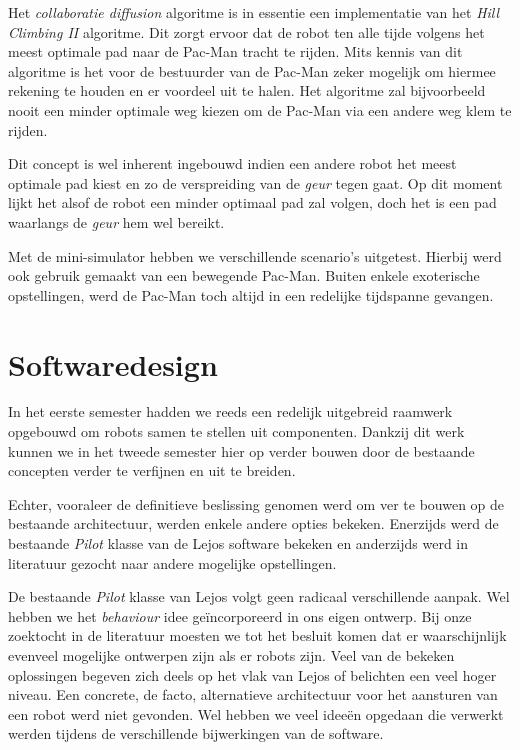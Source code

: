 \documentclass[12pt,a4paper]{report}
\begin{document}
Het \emph{collaboratie diffusion} algoritme is in essentie een implementatie van het \emph{Hill Climbing II} algoritme. Dit zorgt ervoor dat de robot ten alle tijde volgens het meest optimale pad naar de Pac-Man tracht te rijden. Mits kennis van dit algoritme is het voor de bestuurder van de Pac-Man zeker mogelijk om hiermee rekening te houden en er voordeel uit te halen. Het algoritme zal bijvoorbeeld nooit een minder optimale weg kiezen om de Pac-Man via een andere weg klem te rijden.

Dit concept is wel inherent ingebouwd indien een andere robot het meest optimale pad kiest en zo de verspreiding van de \emph{geur} tegen gaat. Op dit moment lijkt het alsof de robot een minder optimaal pad zal volgen, doch het is een pad waarlangs de \emph{geur} hem wel bereikt.

Met de mini-simulator hebben we verschillende scenario's uitgetest. Hierbij werd ook gebruik gemaakt van een bewegende Pac-Man. Buiten enkele exoterische opstellingen, werd de Pac-Man toch altijd in een redelijke tijdspanne gevangen.

\chapter{Softwaredesign}

In het eerste semester hadden we reeds een redelijk uitgebreid raamwerk opgebouwd om robots samen te stellen uit componenten. Dankzij dit werk kunnen we in het tweede semester hier op verder bouwen door de bestaande concepten verder te verfijnen en uit te breiden.

Echter, vooraleer de definitieve beslissing genomen werd om ver te bouwen op de bestaande architectuur, werden enkele andere opties bekeken. Enerzijds werd de bestaande \emph{Pilot} klasse van de Lejos software bekeken en anderzijds werd in literatuur gezocht naar andere mogelijke opstellingen.

De bestaande \emph{Pilot} klasse van Lejos volgt geen radicaal verschillende aanpak. Wel hebben we het \emph{behaviour} idee ge\"incorporeerd in ons eigen ontwerp. Bij onze zoektocht in de literatuur moesten we tot het besluit komen dat er waarschijnlijk evenveel mogelijke ontwerpen zijn als er robots zijn. Veel van de bekeken oplossingen begeven zich deels op het vlak van Lejos of belichten een veel hoger niveau. Een concrete, de facto, alternatieve architectuur voor het aansturen van een robot werd niet gevonden. Wel hebben we veel idee\"en opgedaan die verwerkt werden tijdens de verschillende bijwerkingen van de software.
\end{document}
